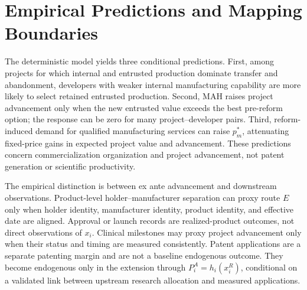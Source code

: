 \documentclass[12pt]{article}
\newcommand{\1}{\mathbf{1}}
\begin{document}
\section{Empirical Predictions and Mapping Boundaries}

The deterministic model yields three conditional predictions. First, among
projects for which internal and entrusted production dominate transfer and
abandonment, developers with weaker internal manufacturing capability are
more likely to select retained entrusted production. Second, MAH raises
project advancement only when the new entrusted value exceeds the best
pre-reform option; the response can be zero for many project--developer pairs.
Third, reform-induced demand for qualified manufacturing services can raise
\(p_m^*\), attenuating fixed-price gains in expected project value and
advancement. These predictions concern commercialization organization and
project advancement, not patent generation or scientific productivity.

The empirical distinction is between ex ante advancement and downstream
observations. Product-level holder--manufacturer separation can proxy route
\(E\) only when holder identity, manufacturer identity, product identity, and
effective date are aligned. Approval or launch records are realized-product
outcomes, not direct observations of \(x_i\). Clinical milestones may proxy
project advancement only when their status and timing are measured consistently.
Patent applications are a separate patenting margin and are not a baseline
endogenous outcome. They become endogenous only in the extension through
\(P_i^A=h_i(x_i^R)\), conditional on a validated link between upstream
research allocation and measured applications.
\end{document}
